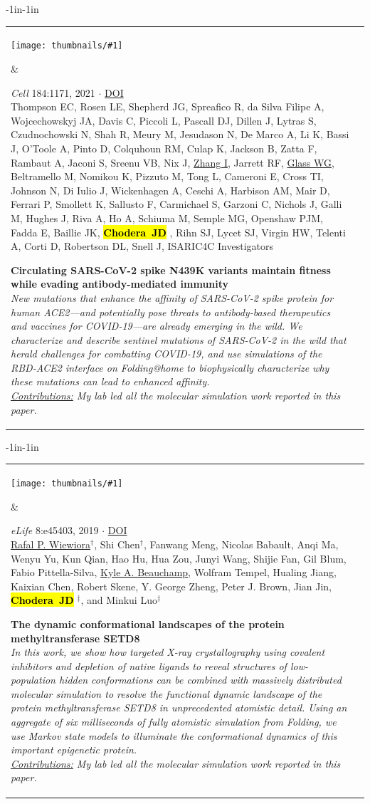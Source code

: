 \documentclass[10pt]{article}
\newcommand{\newarticle}[7]{
\begin{adjustwidth}{-1in}{-1in}  
\begin{tabular}{p{0.9in}p{7in}}
\parbox[c]{0.9in}{\texttt{[image: thumbnails/\#1]}} & \parbox[c]{6in}{\setstretch{0.9} {\small #4} $\cdot$ \href{#6}{#5} \\ {\footnotesize {#2}} \\ \raggedright { \bf\nohyphens{#3}}  \\ {\footnotesize\emph {#7}}} %
\end{tabular}
\end{adjustwidth}
\vspace{0.2in}
}
\newcommand{\jdc}{ {\bf \hl{Chodera~JD}} } %
\begin{document}
\newarticle{vir-cell-xray.jpg}{Thompson EC, Rosen LE, Shepherd JG, Spreafico R, da Silva Filipe A, Wojcechowskyj JA, Davis C, Piccoli L, Pascall DJ, Dillen J, Lytras S, Czudnochowski N, Shah R, Meury M, Jesudason N, De Marco A, Li K, Bassi J, O'Toole A, Pinto D, Colquhoun RM, Culap K, Jackson B, Zatta F, Rambaut A, Jaconi S, Sreenu VB, Nix J, \underline{Zhang I}, Jarrett RF, \underline{Glass WG}, Beltramello M, Nomikou K, Pizzuto M, Tong L, Cameroni E, Cross TI, Johnson N, Di Iulio J, Wickenhagen A, Ceschi A, Harbison AM, Mair D, Ferrari P, Smollett K, Sallusto F, Carmichael S, Garzoni C, Nichols J, Galli M, Hughes J, Riva A, Ho A, Schiuma M, Semple MG, Openshaw PJM, Fadda E, Baillie JK, \jdc, Rihn SJ, Lycet SJ, Virgin HW, Telenti A, Corti D, Robertson DL, Snell J, ISARIC4C Investigators}{Circulating SARS-CoV-2 spike N439K variants maintain fitness while evading antibody-mediated immunity}{\emph{Cell} 184:1171, 2021}{DOI}{https://doi.org/10.1016/j.cell.2021.01.037}{New mutations that enhance the affinity of SARS-CoV-2 spike protein for human ACE2---and potentially pose threats to antibody-based therapeutics and vaccines for COVID-19---are already emerging in the wild. We characterize and describe sentinel mutations of SARS-CoV-2 in the wild that herald challenges for combatting COVID-19, and use simulations of the RBD-ACE2 interface on Folding@home to biophysically characterize why these mutations can lead to enhanced affinity.\\
\underline{Contributions:} My lab led all the molecular simulation work reported in this paper.
}

\newarticle{setd8-msm}{\underline{Rafal P. Wiewiora}$^\dag$, Shi Chen$^\dag$, Fanwang Meng, Nicolas Babault, Anqi Ma, Wenyu Yu, Kun Qian, Hao Hu, Hua Zou, Junyi Wang, Shijie Fan, Gil Blum, Fabio Pittella-Silva, \underline{Kyle A. Beauchamp}, Wolfram Tempel, Hualing Jiang, Kaixian Chen, Robert Skene, Y. George Zheng, Peter J. Brown, Jian Jin, \jdc$^\ddag$, and Minkui Luo$^\ddag$}{The dynamic conformational landscapes of the protein methyltransferase SETD8}{\emph{eLife} 8:e45403, 2019}{DOI}{http://doi.org/10.7554/eLife.45403}{In this work, we show how targeted X-ray crystallography using covalent inhibitors and depletion of native ligands to reveal structures of low-population hidden conformations can be combined with massively distributed molecular simulation to resolve the functional dynamic landscape of the protein methyltransferase SETD8 in unprecedented atomistic detail. Using an aggregate of six milliseconds of fully atomistic simulation from Folding\@home, we use Markov state models to illuminate the conformational dynamics of this important epigenetic protein.\\
\underline{Contributions:} My lab led all the molecular simulation work reported in this paper.
}
\end{document}
